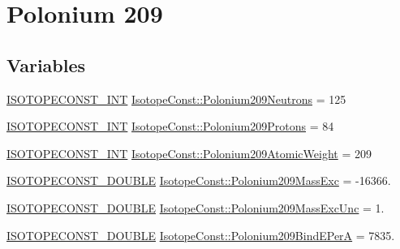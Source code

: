 \hypertarget{group___isotope_const-_polonium-_po209}{}\section{Polonium 209}
\label{group___isotope_const-_polonium-_po209}
\subsection*{Variables}
\begin{DoxyCompactItemize}
\item 
\mbox{\hyperlink{group___isotope_const-_macros_ga5f18360b3e99483a35c32d789e62621c}{I\+S\+O\+T\+O\+P\+E\+C\+O\+N\+S\+T\+\_\+\+I\+NT}} \mbox{\hyperlink{group___isotope_const-_polonium-_po209_gaec34ff4a76f834576a14ca414b57b2f1}{Isotope\+Const\+::\+Polonium209\+Neutrons}} = 125
\item 
\mbox{\hyperlink{group___isotope_const-_macros_ga5f18360b3e99483a35c32d789e62621c}{I\+S\+O\+T\+O\+P\+E\+C\+O\+N\+S\+T\+\_\+\+I\+NT}} \mbox{\hyperlink{group___isotope_const-_polonium-_po209_ga378b3dd3a116e97eb108713cf80d41f2}{Isotope\+Const\+::\+Polonium209\+Protons}} = 84
\item 
\mbox{\hyperlink{group___isotope_const-_macros_ga5f18360b3e99483a35c32d789e62621c}{I\+S\+O\+T\+O\+P\+E\+C\+O\+N\+S\+T\+\_\+\+I\+NT}} \mbox{\hyperlink{group___isotope_const-_polonium-_po209_ga0ce6f60b8584d1ac1f41060700b923db}{Isotope\+Const\+::\+Polonium209\+Atomic\+Weight}} = 209
\item 
\mbox{\hyperlink{group___isotope_const-_macros_ga8f45a7272ce02c0b4c65c44636ed719a}{I\+S\+O\+T\+O\+P\+E\+C\+O\+N\+S\+T\+\_\+\+D\+O\+U\+B\+LE}} \mbox{\hyperlink{group___isotope_const-_polonium-_po209_ga66cf2b55e8038bdcaec3bc8b139f0771}{Isotope\+Const\+::\+Polonium209\+Mass\+Exc}} = -\/16366.
\item 
\mbox{\hyperlink{group___isotope_const-_macros_ga8f45a7272ce02c0b4c65c44636ed719a}{I\+S\+O\+T\+O\+P\+E\+C\+O\+N\+S\+T\+\_\+\+D\+O\+U\+B\+LE}} \mbox{\hyperlink{group___isotope_const-_polonium-_po209_ga9a73deecffa12bc5d112640e71c1b5f3}{Isotope\+Const\+::\+Polonium209\+Mass\+Exc\+Unc}} = 1.
\item 
\mbox{\hyperlink{group___isotope_const-_macros_ga8f45a7272ce02c0b4c65c44636ed719a}{I\+S\+O\+T\+O\+P\+E\+C\+O\+N\+S\+T\+\_\+\+D\+O\+U\+B\+LE}} \mbox{\hyperlink{group___isotope_const-_polonium-_po209_ga9199bb60eceeb1e36f1721e7f78e9678}{Isotope\+Const\+::\+Polonium209\+Bind\+E\+PerA}} = 7835.
\item 

\end{DoxyCompactItemize}
